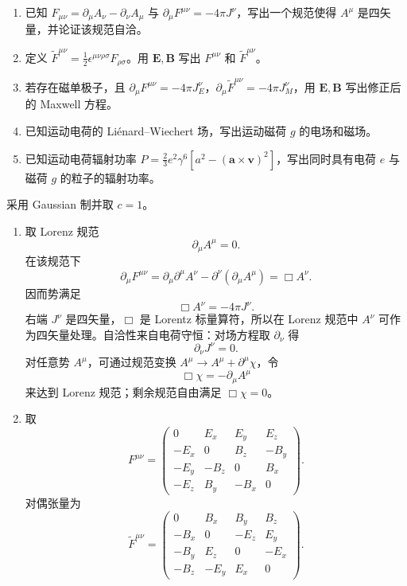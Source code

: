 

\begin{question}
\begin{enumerate}
  \item 已知 $F_{\mu\nu}=\partial_\mu A_\nu-\partial_\nu A_\mu$ 与 $\partial_\mu F^{\mu\nu}=-4\pi J^\nu$，写出一个规范使得 $A^\mu$ 是四矢量，并论证该规范自洽。
  \item 定义 $\tilde F^{\mu\nu}=\frac12\epsilon^{\mu\nu\rho\sigma}F_{\rho\sigma}$。用 $\mathbf E,\mathbf B$ 写出 $F^{\mu\nu}$ 和 $\tilde F^{\mu\nu}$。
  \item 若存在磁单极子，且 $\partial_\mu F^{\mu\nu}=-4\pi J_E^\nu$，$\partial_\mu\tilde F^{\mu\nu}=-4\pi J_M^\nu$，用 $\mathbf E,\mathbf B$ 写出修正后的 Maxwell 方程。
  \item 已知运动电荷的 Liénard--Wiechert 场，写出运动磁荷 $g$ 的电场和磁场。
  \item 已知运动电荷辐射功率 $P=\frac23e^2\gamma^6[a^2-(\mathbf a\times\mathbf v)^2]$，写出同时具有电荷 $e$ 与磁荷 $g$ 的粒子的辐射功率。
\end{enumerate}
\begin{solution}
采用 Gaussian 制并取 $c=1$。
\begin{enumerate}
  \item 取 Lorenz 规范
  \[
    \boxed{\partial_\mu A^\mu=0} .
  \]
  在该规范下
  \[
    \partial_\mu F^{\mu\nu}
    =\partial_\mu\partial^\mu A^\nu-\partial^\nu(\partial_\mu A^\mu)
    =\Box A^\nu .
  \]
  因而势满足
  \[
    \Box A^\nu=-4\pi J^\nu .
  \]
  右端 $J^\nu$ 是四矢量，$\Box$ 是 Lorentz 标量算符，所以在 Lorenz 规范中 $A^\nu$ 可作为四矢量处理。自洽性来自电荷守恒：对场方程取 $\partial_\nu$ 得
  \[
    \partial_\nu J^\nu=0 .
  \]
  对任意势 $A^\mu$，可通过规范变换 $A^\mu\to A^\mu+\partial^\mu\chi$，令
  \[
    \Box\chi=-\partial_\mu A^\mu
  \]
  来达到 Lorenz 规范；剩余规范自由满足 $\Box\chi=0$。

  \item 取
  \[
    F^{\mu\nu}=\begin{pmatrix}
    0&E_x&E_y&E_z\\
    -E_x&0&B_z&-B_y\\
    -E_y&-B_z&0&B_x\\
    -E_z&B_y&-B_x&0
    \end{pmatrix} .
  \]
  对偶张量为
  \[
    \tilde F^{\mu\nu}=\begin{pmatrix}
    0&B_x&B_y&B_z\\
    -B_x&0&-E_z&E_y\\
    -B_y&E_z&0&-E_x\\
    -B_z&-E_y&E_x&0
    \end{pmatrix} .
  \]


\end{enumerate}
\end{solution}
\end{question}
